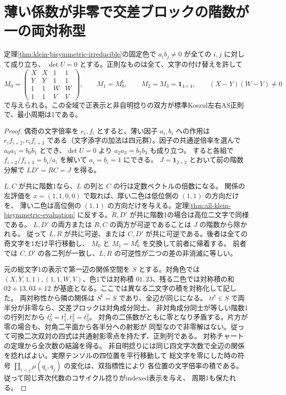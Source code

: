 \section{薄い係数が非零で交差ブロックの階数が一の両対称型}
\label{sec:klein-singular-exchange-corners}
\begin{theorem}\label{thm:klein-singular-exchange-corners}
定理\ref{thm:klein-bisymmetric-irreducible}の固定色で $a_ib_j\ne0$ が全ての $i,j$ に対して成り立ち、
$\det U=0$ とする。正則なものは全て、文字の付け替えを許して
\[
 M_0=\begin{pmatrix}X&X&1&1\\Y&Y&1&1\\1&1&W&W\\1&1&V&V\end{pmatrix},
 \qquad M_1=M_0^{\mathsf t},\qquad M_2=M_3=\boldsymbol1_{4\times4},
 \qquad (X-Y)(W-V)\ne0
\]
で与えられる。この全域で正表示と非自明捻りの双方が標準Koszul左右AS正則で、最小周期は1である。
\end{theorem}
\begin{proof}
偶奇の文字倍率を $e_i,f_i$ とすると、薄い因子 $a_i,b_i$ への作用は
$e_if_{i+2},e_if_{i+3}$ である（文字添字の加法は四元群）。因子の共通逆倍率を選んで
$a_0a_1=b_0b_1$ とでき、$\det U=0$ より $a_2a_3=b_2b_3$ も成り立つ。
すると各組で $f_{i+2}/f_{i+3}=b_i/a_i$ を解いて $a_i=b_i=1$ にできる。
$J=\boldsymbol1_{2\times2}$ とおいて前の階数分解で $LD'=RC=J$ を得る。

$L,C$ が共に階数1なら、$L$ の列と $C$ の行は定数ベクトルの倍数になる。
関係の左評価を $x=(1,1,0,0)$ で取れば、厚い二色は低位側の $(1,1)$ の方向だけを、
薄い二色は高位側の $(1,1)$ の方向だけを与える。定理\ref{thm:all-klein-bisymmetric-evaluation}
に反する。$R,D'$ が共に階数1の場合は高位二文字で同様である。
$L,D'$ の両方または $R,C$ の両方が可逆であることは $J$ の階数から除かれる。
従って $L,R$ が共に可逆、または $C,D'$ が共に可逆である。後者は全ての奇文字を1だけ平行移動し、
$M_0$ と $M_1=M_0^{\mathsf t}$ を交換して前者に帰着する。
前者では $C,D'$ の各二列が一致し、$L,R$ の可逆性が二つの差の非消滅に等しい。

元の総文字1の表示で第一辺の関係空間を $S$ とする。対角色では
$(X,Y,1,1),(1,1,W,V)$、色1では対称積 $01,23$、残る二色では対称積の和
$02+13,03+12$ が基底となる。ここでは異なる二文字の積を対称化して記した。
両対称性から隣の関係は $S^{\mathsf t}=S$ であり、全辺が同じになる。
$tt^{\mathsf t}\in S$ で両半分が非零なら、交差ブロックは対角成分同士、
非対角成分同士が等しい階数1の行列だから $t_0^2=t_1^2,t_2^2=t_3^2$。
対角の二係数がともに零となり矛盾する。片方が零の場合も、対角二平面から各半分への射影が
同型なので非零解はない。従って可換二次双対の四式は共通射影零点を持たず、正則列である。
対称チャートの定理から全次数の結論を得る。
非自明捻りには同じ四文字次数で全辺の関係を捻ればよい。実際テンソルの四位置を平行移動して
総文字を零にした時の符号 $\prod_{i<j}\mu(q_i,q_j)$ の変化は、双指標性により
各位置の文字倍率の積である。従って同じ斉次代数のコサイクル捻りがindexed表示を与え、
周期1も保たれる。
\end{proof}

